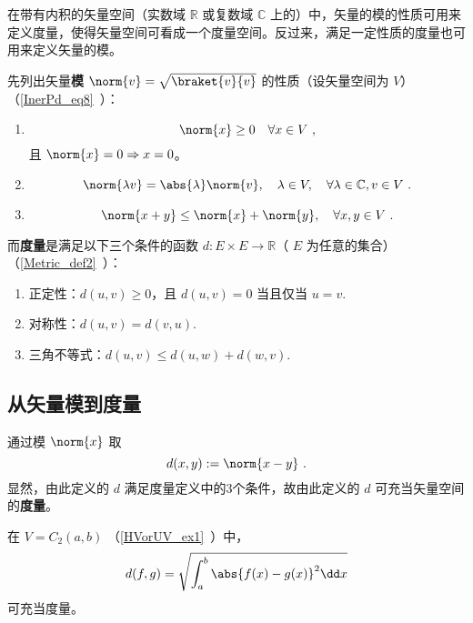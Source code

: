 

在带有内积的矢量空间（实数域 $\mathbb R$ 或复数域 $\mathbb C$ 上的）中，矢量的模的性质可用来定义度量，使得矢量空间可看成一个度量空间。反过来，满足一定性质的度量也可用来定义矢量的模。

先列出矢量\textbf{模} $\norm{v}=\sqrt{\braket{v}{v}}$ 的性质（设矢量空间为 $V$）（\autoref{InerPd_eq8}~）：
\begin{enumerate}
\item 
\begin{equation}\label{SNadM_eq1}
\norm{x}\geq 0\quad \forall x\in V~,
\end{equation}
且 $\norm{x}=0\Rightarrow x=0$。
\item \begin{equation}\label{SNadM_eq2}
\norm{\lambda v}=\abs{\lambda}\norm{v},\quad \lambda\in V,\quad\forall\lambda\in\mathbb C,v\in V~.
\end{equation}
\item 
\begin{equation}
\norm{x+y}\leq\norm{x}+\norm{y},\quad \forall x,y\in V~.
\end{equation}
\end{enumerate}

而\textbf{度量}是满足以下三个条件的函数 $d:E\times E\rightarrow\mathbb R$（ $E$ 为任意的集合）（\autoref{Metric_def2}~）：
\begin{enumerate}
\item 正定性：$d(u, v) \geq 0$，且 $d(u, v)=0$ 当且仅当 $u=v$.
\item 对称性：$d(u, v) = d(v, u)$.
\item 三角不等式：$d(u, v) \leqslant d(u, w) + d(w, v)$.
\end{enumerate}
\subsection{从矢量模到度量}
通过模 $\norm{x}$ 取
\begin{equation}
d(x,y):=\norm{x-y}~.
\end{equation}
显然，由此定义的 $d$ 满足度量定义中的3个条件，故由此定义的 $d$ 可充当矢量空间的\textbf{度量}。
\begin{example}{}
在 $V=C_2(a,b)$ （\autoref{HVorUV_ex1}~）中，
\begin{equation}
d(f,g)=\sqrt{\int_a^b\abs{f(x)-g(x)}^2\dd x}
\end{equation}
可充当度量。
\end{example}
